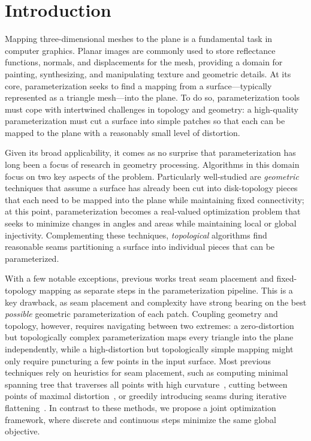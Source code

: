 
\section{Introduction}
Mapping three-dimensional meshes to the plane is a fundamental task in computer graphics.  Planar images are commonly used to store reflectance functions, normals, and displacements
for the mesh, providing a domain for painting, synthesizing, and manipulating texture and geometric details. 
At its core, parameterization seeks to find a mapping from a surface---typically represented as a triangle mesh---into the plane.  To do so, parameterization tools must cope with intertwined challenges in topology and geometry:  a high-quality parameterization must cut a surface into simple %
patches so that each can be mapped to the plane with a reasonably small level of distortion.

Given its broad applicability, it comes as no surprise that parameterization has long been a focus of research in geometry processing.  Algorithms in this domain focus on two key aspects of the problem.  Particularly well-studied are \emph{geometric} techniques that assume a surface has already been cut into disk-topology pieces that each need to be mapped into the plane while maintaining fixed connectivity; at this point, parameterization becomes a real-valued optimization problem that seeks to minimize changes in angles and areas while maintaining local or global injectivity. Complementing these techniques, \emph{topological} algorithms find reasonable seams partitioning a surface into individual pieces that can be parameterized.  

With a few notable exceptions, previous works treat seam placement and fixed-topology mapping as separate steps in the parameterization pipeline.  This is a key drawback, as seam placement and complexity have strong bearing on the best \emph{possible} geometric parameterization of each patch.  Coupling geometry and topology, however, requires navigating between two extremes: a zero-distortion but topologically complex parameterization maps every triangle into the plane independently, while a high-distortion but topologically simple mapping might only require puncturing a few points in the input surface.
%
%
Most previous techniques rely on heuristics for seam placement, such as computing minimal spanning tree that traverses all points with high curvature~\cite{Sheffer2002Seamster}, cutting between points of maximal distortion~\cite{Gu2002Geometry}, or greedily introducing seams during iterative flattening~\cite{BoundedDistortParam:2002}. In contrast to these methods, we propose a joint optimization framework, where discrete and continuous steps minimize the same global objective. 


